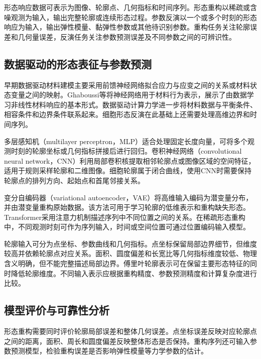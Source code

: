 形态响应数据可表示为图像、轮廓点、几何指标和时间序列。形态重构以稀疏或含噪观测为输入，输出完整轮廓或连续形态过程。参数反演以一个或多个时刻的形态响应为输入，输出弹性模量、黏弹性参数或其他待识别参数。重构任务关注轮廓误差和几何量误差，反演任务关注参数预测误差及不同参数之间的可辨识性。

\subsection{数据驱动的形态表征与参数预测}

早期数据驱动材料建模主要采用前馈神经网络拟合应力与应变之间的关系或材料状态变量之间的映射。Ghaboussi等将神经网络用于材料行为表示，展示了由数据学习非线性材料响应的基本形式\cite{ghaboussi1991materialnn}。数据驱动计算力学进一步将材料数据与平衡条件、相容条件和边界条件联系起来\cite{kirchdoerfer2016datadriven}。细胞形态反演在此基础上还需要处理高维边界和时间序列。

多层感知机（multilayer perceptron，MLP）适合处理固定长度向量，可将多个观测时刻的轮廓坐标或几何指标拼接后进行回归。卷积神经网络（convolutional neural network，CNN）利用局部卷积核提取相邻轮廓点或图像区域的空间特征，适用于规则采样轮廓和二维图像\cite{lecun2015deeplearning,krizhevsky2012imagenet,he2016resnet}。细胞轮廓属于闭合曲线，使用CNN时需要保持轮廓点的排列方向、起始点和首尾邻接关系。

变分自编码器（variational autoencoder，VAE）将高维输入编码为潜变量分布，并由潜变量重构原始数据\cite{kingma2014vae}。该方法可用于学习轮廓的低维表示和重构缺失形态。Transformer采用注意力机制描述序列中不同位置之间的关系\cite{vaswani2017attention}。在稀疏形态重构中，不同观测时刻可作为序列输入，时间或空间位置可通过位置编码输入模型。

轮廓输入可分为点坐标、参数曲线和几何指标。点坐标保留局部边界细节，但维度较高并依赖轮廓点对应关系。面积、圆度偏差和长宽比等几何指标维度较低、物理含义明确，但不能完整描述局部边界。傅里叶轮廓表示可在保留主要形态特征的同时降低轮廓维度\cite{kuhl1982elliptic}。不同输入表示应根据重构精度、参数预测精度和计算复杂度进行比较。

\subsection{模型评价与可靠性分析}

形态重构需要同时评价轮廓局部误差和整体几何误差。点坐标误差反映对应轮廓点之间的距离，面积、周长和圆度偏差反映整体形态是否保持。重构序列还可输入参数预测模型，检验重构误差是否影响弹性模量等力学参数的估计。

